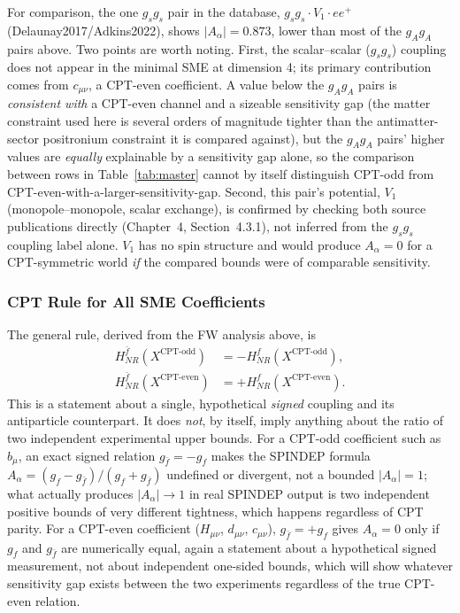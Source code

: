 \documentclass[main]{subfiles}
\begin{document}
For comparison, the one $g_sg_s$ pair in the database, $g_sg_s\cdot
V_1\cdot ee^+$ (Delaunay2017/Adkins2022), shows $|A_\alpha|=0.873$, lower
than most of the $g_Ag_A$ pairs above. Two points are worth noting. First,
the scalar--scalar ($g_sg_s$) coupling does not appear in the minimal SME
at dimension 4; its primary contribution comes from $c_{\mu\nu}$, a
CPT-even coefficient. A value below the $g_Ag_A$ pairs is \emph{consistent
with} a CPT-even channel and a sizeable sensitivity gap (the matter
constraint used here is several orders of magnitude tighter than the
antimatter-sector positronium constraint it is compared against), but the
$g_Ag_A$ pairs' higher values are \emph{equally} explainable by a
sensitivity gap alone, so the comparison between rows in
Table~\ref{tab:master} cannot by itself distinguish CPT-odd from
CPT-even-with-a-larger-sensitivity-gap. Second, this pair's potential,
$V_1$ (monopole--monopole, scalar exchange), is confirmed by checking both
source publications directly (Chapter~4, Section~4.3.1), not inferred from
the $g_sg_s$ coupling label alone. $V_1$
has no spin structure and would produce $A_\alpha=0$ for a CPT-symmetric
world \emph{if} the compared bounds were of comparable sensitivity.

\subsubsection{CPT Rule for All SME Coefficients}

The general rule, derived from the FW analysis above, is
\begin{align}
  H_{NR}^{\bar f}\!\left(X^{\text{CPT-odd}}\right)  &= -H_{NR}^{f}\!\left(X^{\text{CPT-odd}}\right), \\
  H_{NR}^{\bar f}\!\left(X^{\text{CPT-even}}\right) &= +H_{NR}^{f}\!\left(X^{\text{CPT-even}}\right).
\end{align}
This is a statement about a single, hypothetical \emph{signed} coupling and
its antiparticle counterpart. It does \emph{not}, by itself, imply anything
about the ratio of two independent experimental upper bounds. For a
CPT-odd coefficient such as $b_\mu$, an exact signed relation
$g_{\bar f}=-g_f$ makes the SPINDEP formula
$A_\alpha=(g_f-g_{\bar f})/(g_f+g_{\bar f})$ undefined or divergent, not a
bounded $|A_\alpha|=1$; what actually produces $|A_\alpha|\to1$ in real
SPINDEP output is two independent positive bounds of very different
tightness, which happens regardless of CPT parity. For a CPT-even
coefficient ($H_{\mu\nu}$, $d_{\mu\nu}$, $c_{\mu\nu}$), $g_{\bar f}=+g_f$
gives $A_\alpha=0$ only if $g_f$ and $g_{\bar f}$ are numerically equal,
again a statement about a hypothetical signed measurement, not about
independent one-sided bounds, which will show whatever sensitivity gap
exists between the two experiments regardless of the true CPT-even
relation.
\end{document}
